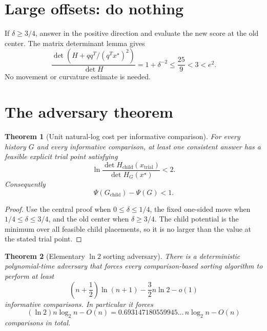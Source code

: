 \documentclass[11pt]{article}
\newtheorem{theorem}{Theorem}[section]
\theoremstyle{definition}
\newcommand{\1}{\mathbf{1}}
\begin{document}
\section{Large offsets: do nothing}

If $\delta\ge3/4$, answer in the positive direction and evaluate the new score at the old center.  The matrix determinant lemma gives
\begin{equation}
\frac{\det(H+qq^T/(q^Tx^\star)^2)}{\det H}
=1+\delta^{-2}
\le\frac{25}{9}<3<e^2.
\label{eq:large-offset}
\end{equation}
No movement or curvature estimate is needed.

\section{The adversary theorem}

\begin{theorem}[Unit natural-log cost per informative comparison]
For every history $G$ and every informative comparison, at least one consistent answer has a feasible explicit trial point satisfying
\[
\ln\frac{\det H_{\mathrm{child}}(x_{\mathrm{trial}})}
        {\det H_G(x^\star)}<2.
\]
Consequently
\begin{equation}
\Psi(G_{\mathrm{child}})-\Psi(G)<1.
\label{eq:unit-cost}
\end{equation}
\end{theorem}

\begin{proof}
Use the central proof when $0\le\delta\le1/4$, the fixed one-sided move when $1/4\le\delta\le3/4$, and the old center when $\delta\ge3/4$.  The child potential is the minimum over all feasible child placements, so it is no larger than the value at the stated trial point.
\end{proof}

\begin{theorem}[Elementary $\ln2$ sorting adversary]
There is a deterministic polynomial-time adversary that forces every comparison-based sorting algorithm to perform at least
\begin{equation}
\left(n+\frac12\right)\ln(n+1)-\frac32n\ln2-o(1)
\label{eq:exact-lower}
\end{equation}
informative comparisons.  In particular it forces
\begin{equation}
(\ln2)n\log_2n-O(n)
=0.693147180559945\ldots\,n\log_2n-O(n)
\label{eq:ln2-theorem}
\end{equation}
comparisons in total.
\end{theorem}
\end{document}
